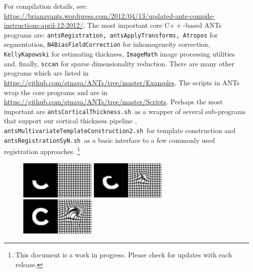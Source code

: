 \documentclass{InsightArticle}
\begin{document}
For compilation details, see: \href{https://brianavants.wordpress.com/2012/04/13/updated-ants-compile-instructions-april-12-2012/}{https://brianavants.wordpress.com/2012/04/13/updated-ants-compile-instructions-april-12-2012/}.
The most important core C${++}$-based ANTs programs are: 
\texttt{antsRegistration, antsApplyTransforms, Atropos} for
segmentation, \texttt{N4BiasFieldCorrection} for
inhomogeneity correction,  \texttt{KellyKapowski} for estimating
thickness, \texttt{ImageMath} image processing utilities
and, finally, \texttt{sccan} for sparse dimensionality reduction.  There
are many other programs which are listed in
\href{https://github.com/stnava/ANTs/tree/master/Examples}{https://github.com/stnava/ANTs/tree/master/Examples}.
The scripts in ANTs wrap the core programs and are in
\href{https://github.com/stnava/ANTs/tree/master/Scripts}{https://github.com/stnava/ANTs/tree/master/Scripts}.
Perhaps the most important are \texttt{antsCorticalThickness.sh}~as a
wrapper of several sub-programs that support our
cortical thickness pipeline \cite{TustisonACT}, \texttt{antsMultivariateTemplateConstruction2.sh}~for template construction
and \texttt{antsRegistrationSyN.sh}~as a basic interface to a few commonly used registration approaches.
\footnote{This document is a work in progress. Please check for updates with each release.}
\begin{figure}
\includegraphics[width=0.33\textwidth]{Figures/grid1100.pdf} 
\includegraphics[width=0.33\textwidth]{Figures/grid1110.pdf} 
\includegraphics[width=0.33\textwidth]{Figures/grid1119.pdf} 
\vspace{-0.1in}
\label{fig:chalf}
\end{figure}
\end{document}
